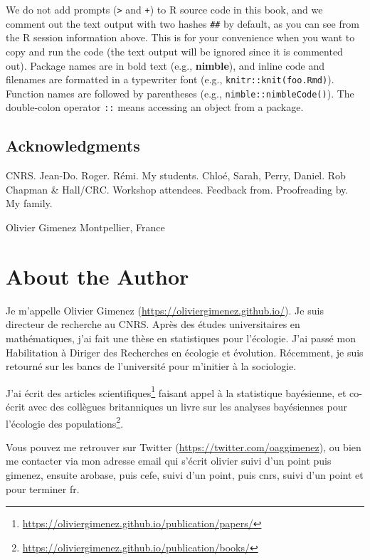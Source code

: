 \documentclass[
  12pt,
]{krantz}
\renewcommand{\href}[2]{#2\footnote{\url{#1}}}
\begin{document}
We do not add prompts (\texttt{\textgreater{}} and \texttt{+}) to R source code in this book, and we comment out the text output with two hashes \texttt{\#\#} by default, as you can see from the R session information above. This is for your convenience when you want to copy and run the code (the text output will be ignored since it is commented out). Package names are in bold text (e.g., \textbf{nimble}), and inline code and filenames are formatted in a typewriter font (e.g., \texttt{knitr::knit(\textquotesingle{}foo.Rmd\textquotesingle{})}). Function names are followed by parentheses (e.g., \texttt{nimble::nimbleCode()}). The double-colon operator \texttt{::} means accessing an object from a package.

\hypertarget{acknowledgments}{%
\section*{Acknowledgments}\label{acknowledgments}}


CNRS. Jean-Do. Roger. Rémi. My students. Chloé, Sarah, Perry, Daniel. Rob Chapman \& Hall/CRC. Workshop attendees. Feedback from. Proofreading by. My family.

\begin{flushright}
Olivier Gimenez
Montpellier, France
\end{flushright}

\hypertarget{about-the-author}{%
\chapter*{About the Author}\label{about-the-author}}


Je m'appelle Olivier Gimenez (\url{https://oliviergimenez.github.io/}). Je suis directeur de recherche au CNRS. Après des études universitaires en mathématiques, j'ai fait une thèse en statistiques pour l'écologie. J'ai passé mon Habilitation à Diriger des Recherches en écologie et évolution. Récemment, je suis retourné sur les bancs de l'université pour m'initier à la sociologie.

J'ai écrit des \href{https://oliviergimenez.github.io/publication/papers/}{articles scientifiques} faisant appel à la statistique bayésienne, et co-écrit avec des collègues britanniques un \href{https://oliviergimenez.github.io/publication/books/}{livre sur les analyses bayésiennes pour l'écologie des populations}.

Vous pouvez me retrouver sur Twitter (\url{https://twitter.com/oaggimenez}), ou bien me contacter via mon adresse email qui s'écrit olivier suivi d'un point puis gimenez, ensuite arobase, puis cefe, suivi d'un point, puis cnrs, suivi d'un point et pour terminer fr.
\end{document}
